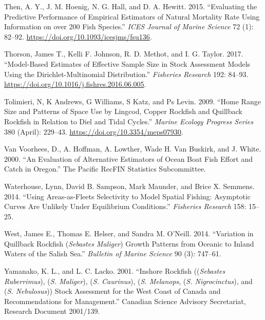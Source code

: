 \documentclass[11pt,
  english,
  a4paper,
]{article}
\begin{document}
\leavevmode\hypertarget{ref-then_evaluating_2015-1}{}%
Then, A. Y., J. M. Hoenig, N. G. Hall, and D. A. Hewitt. 2015. ``Evaluating the Predictive Performance of Empirical Estimators of Natural Mortality Rate Using Information on over 200 Fish Species.'' \emph{ICES Journal of Marine Science} 72 (1): 82--92. \url{https://doi.org/10.1093/icesjms/fsu136}.

\leavevmode\hypertarget{ref-thorson_model-based_2017}{}%
Thorson, James T., Kelli F. Johnson, R. D. Methot, and I. G. Taylor. 2017. ``Model-Based Estimates of Effective Sample Size in Stock Assessment Models Using the Dirichlet-Multinomial Distribution.'' \emph{Fisheries Research} 192: 84--93. \url{https://doi.org/10.1016/j.fishres.2016.06.005}.

\leavevmode\hypertarget{ref-tolimieri_home_2009}{}%
Tolimieri, N, K Andrews, G Williams, S Katz, and Ps Levin. 2009. ``Home Range Size and Patterns of Space Use by Lingcod, Copper Rockfish and Quillback Rockfish in Relation to Diel and Tidal Cycles.'' \emph{Marine Ecology Progress Series} 380 (April): 229--43. \url{https://doi.org/10.3354/meps07930}.

\leavevmode\hypertarget{ref-van_voorhees_evaluation_2000}{}%
Van Voorhees, D., A. Hoffman, A. Lowther, Wade H. Van Buskirk, and J. White. 2000. ``An Evaluation of Alternative Estimators of Ocean Boat Fish Effort and Catch in Oregon.'' The Pacific RecFIN Statistics Subcommittee.

\leavevmode\hypertarget{ref-Waterhouseetal_spatialSelex_2014}{}%
Waterhouse, Lynn, David B. Sampson, Mark Maunder, and Brice X. Semmens. 2014. ``Using Areas-as-Fleets Selectivity to Model Spatial Fishing: Asymptotic Curves Are Unlikely Under Equilibrium Conditions.'' \emph{Fisheries Research} 158: 15--25.

\leavevmode\hypertarget{ref-Westetal_2014}{}%
West, James E., Thomas E. Helser, and Sandra M. O'Neill. 2014. ``Variation in Quillback Rockfish (\emph{Sebastes Maliger}) Growth Patterns from Oceanic to Inland Waters of the Salish Sea.'' \emph{Bulletin of Marine Science} 90 (3): 747--61.

\leavevmode\hypertarget{ref-YamanakaandLacko_rockfish_2001}{}%
Yamanako, K. L., and L. C. Lacko. 2001. ``Inshore Rockfish ((\emph{Sebastes Ruberrimus}), (\emph{S. Maliger}), (\emph{S. Caurinus}), (\emph{S. Melanops}, (\emph{S. Nigrocinctus}), and (\emph{S. Nebulosus})) Stock Assessment for the West Coast of Canada and Recommendations for Management.'' Canadian Science Advisory Secretariat, Research Document 2001/139.
\end{document}
